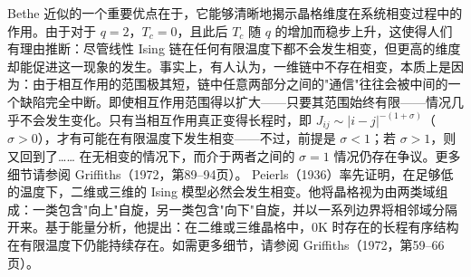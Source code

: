 Bethe 近似的一个重要优点在于，它能够清晰地揭示晶格维度在系统相变过程中的作用。由于对于 \(q=2\)，\(T_c=0\)，且此后 \(T_c\) 随 \(q\) 的增加而稳步上升，这使得人们有理由推断：尽管线性 Ising 链在任何有限温度下都不会发生相变，但更高的维度却能促进这一现象的发生。事实上，有人认为，一维链中不存在相变，本质上是因为：由于相互作用的范围极其短，链中任意两部分之间的"通信"往往会被中间的一个缺陷完全中断。即使相互作用范围得以扩大——只要其范围始终有限——情况几乎不会发生变化。只有当相互作用真正变得长程时，即 \(J_{ij} \sim |i-j|^{-(1+\sigma)}\)（\(\sigma>0\)），才有可能在有限温度下发生相变——不过，前提是 \(\sigma<1\)；若 \(\sigma>1\)，则又回到了\ldots\ldots{}
在无相变的情况下，而介于两者之间的 \(\sigma=1\) 情况仍存在争议。更多细节请参阅 Griffiths（1972，第89--94页）。
Peierls（1936）率先证明，在足够低的温度下，二维或三维的 Ising 模型必然会发生相变。他将晶格视为由两类域组成：一类包含"向上"自旋，另一类包含"向下"自旋，并以一系列边界将相邻域分隔开来。基于能量分析，他提出：在二维或三维晶格中，0K 时存在的长程有序结构在有限温度下仍能持续存在。如需更多细节，请参阅 Griffiths（1972，第59--66页）。
